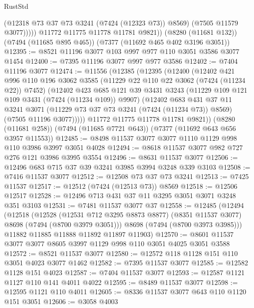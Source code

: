 \begin{lexlean}{RustStd}
\begin{coremodule}
                (@12318 @73 @37 @73 @3241 (@7424 (@12323 @73)) @8569)
                (@7505 @11579 @3077)))))
        @11772
        @11775
        @11778
        @11781
        @9821))
    (@8280 (@11681 @132))
    (@7494 (@11685 @895 @465))
    (@7377 (@11692 @465 @402 @3196 @3051))
@12395 := @8521 @11196 @3077 @103 @997 @977 @110 @3051 @3586 @3077 @1454
@12400 := @7395 @11196 @3077 @997 @977 @3586
@12402 := @7404 @11196 @3077
@12474 := @11556
    (@12385
      (@12395
        (@12400
          (@12402
            @421
            @996
            @110
            @196
            @3062
            @3585
            (@11229 @22 @110 @22 @3062 (@7424 (@11234 @22)) @7452)
            (@12402
              @423
              @685
              @121
              @39
              @3431
              @3243
              (@11229 @109 @121 @109 @3431 (@7424 (@11234 @109)) @9907)
              (@12402
                @683
                @431
                @37
                @11
                @3241
                @3071
                (@11229 @73 @37 @73 @3241 (@7424 (@11234 @73)) @8569)
                (@7505 @11196 @3077)))))
        @11772
        @11775
        @11778
        @11781
        @9821))
    (@8280 (@11681 @258))
    (@7494 (@11685 @7721 @643))
    (@7377 (@11692 @643 @656 @3957 @11553))
@12485 := @8498 @11537 @3077 @3077 @1110 @1129 @998 @110 @3986 @3997 @3051 @4028
@12494 := @8618 @11537 @3077 @982 @727 @276 @121 @3986 @3995 @3554
@12496 := @8631 @11537 @3077
@12506 := @12496 @683 @715 @37 @39 @3241 @3985 @3994 @3248 @339 @3103
@12508 := @7416 @11537 @3077
@12512 := @12508 @73 @37 @73 @3241
@12513 := @7425 @11537
@12517 := @12512 (@7424 (@12513 @73)) @8569
@12518 := @12506 @12517
@12528 := @12496 @713 @431 @37 @11 @3295 @3051 @3071 @3248 @351 @3103
@12531 := @7481 @11537 @3077 @37
@12558 := @12485
    (@12494
      (@12518
        (@12528
          (@12531 @712 @3295 @8873 @8877)
          (@8351 @11537 @3077)
          @8698
          (@7494 (@8700 @3979 @3051)))
        @8698
        (@7494 (@8700 @3973 @3985)))
      @11882
      @11885
      @11888
      @11892
      @11897
      @11903)
@12570 := @8601 @11537 @3077 @3077 @8605 @3997 @1129 @998 @110 @3051 @4025 @3051 @3588
@12572 := @8521 @11537 @3077
@12580 := @12572 @118 @1128 @151 @110 @3051 @4023 @3077 @1462
@12582 := @7395 @11537 @3077
@12585 := @12582 @1128 @151 @4023
@12587 := @7404 @11537 @3077
@12593 := @12587 @1121 @1127 @110 @141 @4011 @4022
@12595 := @8489 @11537 @3077
@12598 := @12595 @1121 @110 @4011
@12605 := @8336 @11537 @3077 @643 @110 @1120 @151 @3051
@12606 := @3058 @4003

\end{coremodule}
\end{lexlean}
